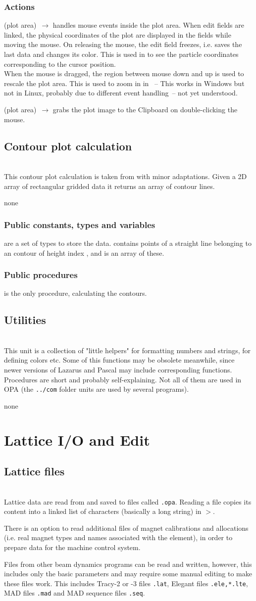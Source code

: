 \documentclass[12pt]{article}
\newcommand\code[1]{{\tt #1}}
\newcommand{\ofldx}[1]{\colorbox{black!15}{(#1)}}
\newcommand\guico[1]{{\color{blue}\code{#1}}}
\newcommand\guifco[1]{{\color{violet}\code{#1}}}
\newcommand{\unico}[1]{{\color{burntorange}\code{#1}}}
\newcommand{\evcodxf}[2]{\ofldx{#1}~$\rightarrow$ \guifco{#2}}
\newcommand{\grcod}[2]{\opagui{#1}$>$\guico{#2}}
\newcommand{\opagui}[1]{\colorbox{blue!20}{{\color{black}\code{#1}}}}
\newcommand{\ogui}[1]{\hyperref[#1]{\opagui{#1}}}
\newcommand{\opauni}[1]{\colorbox{orange!30}{{\color{black}\code{#1}}}}
\newcommand{\ounih}[2]{\subsection{\label{#2}#1}{\Huge\opauni{#2}}\\}
\newcommand{\uses}[1]{\flushleft {\bf Uses:} #1}
\newcommand{\desc}[1]{#1}
\newcommand{\act}[1]{\subsubsection*{Actions} #1}
\newcommand{\pvar}[1]{\subsubsection*{Public constants, types and variables} #1}
\newcommand{\ppro}[1]{\subsubsection*{Public procedures} #1}
\newcommand{\todo}[1]{{\color{red} #1}}
\begin{document}
\act{
\evcodxf{plot area}{pMouseDown,pMouseMove,pMouseUp} handles mouse events inside the plot area.
When edit fields are linked, the physical coordinates of the plot are displayed in the fields while moving the mouse. On releasing the mouse, the edit field freezes, i.e. saves the last data and changes its color.
This is used in \ogui{opatrackps} %
to see the particle coordinates corresponding to the cursor position. \\
When the mouse is dragged, the region between mouse down and up is used to rescale the plot area. This is used to zoom in in \ogui{opageometry}~-- \todo{This works in Windows but not in Linux, probably due to different event handling~-- not yet understood.}

\evcodxf{plot area}{pDblClick} grabs the plot image to the Clipboard on double-clicking the mouse.
}



\ounih{Contour plot calculation}{../com/conrect}

\desc{This contour plot calculation is taken from \cite{CONRECT} with minor adaptations. Given a 2D array of rectangular gridded data it returns an array of contour lines.}

\uses{none}
\pvar{
\unico{Con...} are a set of types to store the data. \unico{ConLinesType} contains points of a straight line belonging to an contour of height index \unico{ih}, and \unico{ConLinesArray} is an array of these.
}
\ppro{
\unico{Conrec} is the only procedure, calculating the contours.}

\ounih{Utilities}{../com/asaux}

\desc{This unit is a collection of "little helpers" for formatting numbers and strings, for defining colors etc. Some of this functions may be obsolete meanwhile, since newer versions of Lazarus and Pascal may include corresponding functions.
Procedures are short and probably self-explaining. Not all of them are used in OPA (the \code{../com} folder units are used by several programs).}

\uses{none}

\section{\label{secedit}Lattice I/O and Edit} 

\ounih{Lattice files}{latfilelib}

\desc{Lattice data are read from and saved to files called \code{*.opa}. Reading a file copies its content into a linked list of characters (basically a long string) in \grcod{opamenu}{ReadFile}.

There is an option to read additional files of magnet calibrations and allocations (i.e. real magnet types and names associated with the element), in order to prepare data for the machine control system.

Files from other beam dynamics programs can be read and written, however, this includes only the basic parameters and may require some manual editing to make these files work. This includes Tracy-2 or -3 files \code{*.lat}, Elegant files \code{*.ele,*.lte}, MAD files \code{*.mad} and MAD sequence files \code{*.seq}.
}
\end{document}
